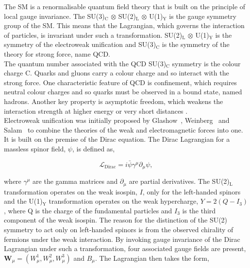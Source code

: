 The \ac{SM} is a renormalisable quantum field theory that is built on the principle of local gauge invariance.
The SU(3)$_{\text{C}}$ $\otimes$ SU(2)$_{\text{L}}$ $\otimes$ U(1)$_{\text{Y}}$ is the gauge symmetry group of the \ac{SM}.
This means that the Lagrangian, which governs the interaction of particles, is invariant under such a transformation. 
SU(2)$_{\text{L}}$ $\otimes$ U(1)$_{\text{Y}}$ is the symmetry of the electroweak unification and SU(3)$_{\text{C}}$ is the symmetry of the theory for strong force, name \ac{QCD}. \\

The quantum number associated with the \ac{QCD} SU(3)$_\text{C}$ symmetry is the colour charge C.
Quarks and gluons carry a colour charge and so interact with the strong force.
One characteristic feature of \ac{QCD} is confinement, which requires neutral colour charges and so quarks must be observed in a bound state, named hadrons.
Another key property is asymptotic freedom, which weakens the interaction strength at higher energy or very short distances \cite{Gross:1973id,Politzer:1973fx}. \\

Electroweak unification was initially proposed by Glashow~\cite{Glashow:1961tr}, Weinberg~\cite{Weinberg:1967tq} and Salam~\cite{Salam:1968rm} to combine the theories of the weak and electromagnetic forces into one.
It is built on the premise of the Dirac equation.
The Dirac Lagrangian for a massless spinor field, $\psi$, is defined as,

\begin{equation}
\mathcal{L}_{\text{Dirac}} = i\bar{\psi}\gamma^{\mu} \partial_{\mu} \psi,
\end{equation}

where $\gamma^{\mu}$ are the gamma matrices and $\partial_{\mu}$ are partial derivatives.
The SU(2)$_{\text{L}}$ transformation operates on the weak isospin, $I$, only for the left-handed spinors and the U(1)$_{\text{Y}}$ transformation operates on the weak hypercharge, $Y=2(Q-I_{3})$, where Q is the charge of the fundamental particles and $I_3$ is the third component of the weak isospin.
The reason for the distinction of the SU(2) symmetry to act only on left-handed spinors is from the observed chirality of fermions under the weak interaction.
By invoking gauge invariance of the Dirac Lagrangian under such a transformation, four associated gauge fields are present, $\boldsymbol{W}_{\mu} = (W^{1}_{\mu}, W^{2}_{\mu}, W^{3}_{\mu})$ and $B_{\mu}$.
The Lagrangian then takes the form,

